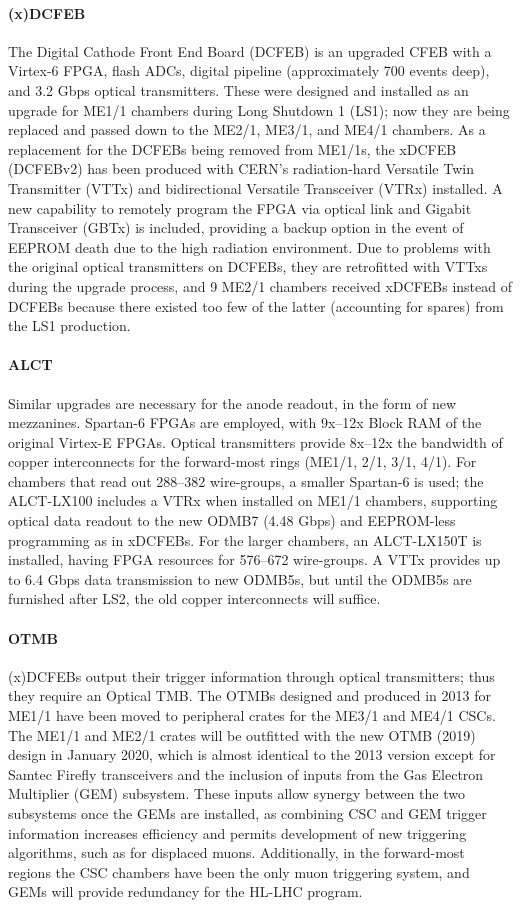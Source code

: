 \documentclass[a4paper,11pt]{article}
\begin{document}
\paragraph{(x)DCFEB}
The Digital Cathode Front End Board (DCFEB) is an upgraded CFEB with a Virtex-6 FPGA, flash ADCs, digital pipeline (approximately 700 events deep), and 3.2 Gbps optical transmitters. These were designed and installed as an upgrade for ME1/1 chambers during Long Shutdown 1 (LS1); now they are being replaced and passed down to the ME2/1, ME3/1, and ME4/1 chambers. As a replacement for the DCFEBs being removed from ME1/1s, the xDCFEB (DCFEBv2) has been produced with CERN's radiation-hard Versatile Twin Transmitter (VTTx) and bidirectional Versatile Transceiver (VTRx) installed. A new capability to remotely program the FPGA via optical link and Gigabit Transceiver (GBTx) is included, providing a backup option in the event of EEPROM death due to the high radiation environment. Due to problems with the original optical transmitters on DCFEBs, they are retrofitted with VTTxs during the upgrade process, and 9 ME2/1 chambers received xDCFEBs instead of DCFEBs because there existed too few of the latter (accounting for spares) from the LS1 production.
\paragraph{ALCT}
Similar upgrades are necessary for the anode readout, in the form of new mezzanines.  Spartan-6 FPGAs are employed, with 9x--12x Block RAM of the original Virtex-E FPGAs. Optical transmitters provide 8x--12x the bandwidth of copper interconnects for the forward-most rings (ME1/1, 2/1, 3/1, 4/1). For chambers that read out 288--382 wire-groups, a smaller Spartan-6 is used; the ALCT-LX100 includes a VTRx when installed on ME1/1 chambers, supporting optical data readout to the new ODMB7 (4.48 Gbps) and EEPROM-less programming as in xDCFEBs. For the larger chambers, an ALCT-LX150T is installed, having FPGA resources for 576--672 wire-groups. A VTTx provides up to 6.4 Gbps data transmission to new ODMB5s, but until the ODMB5s are furnished after LS2, the old copper interconnects will suffice.

\paragraph{OTMB}
(x)DCFEBs output their trigger information through optical transmitters; thus they require an Optical TMB. The OTMBs designed and produced in 2013 for ME1/1 have been moved to peripheral crates for the ME3/1 and ME4/1 CSCs. The ME1/1 and ME2/1 crates will be outfitted with the new OTMB (2019) design in January 2020, which is almost identical to the 2013 version except for Samtec Firefly transceivers and the inclusion of inputs from the Gas Electron Multiplier (GEM) subsystem. These inputs allow synergy between the two subsystems once the GEMs are installed, as 
combining CSC and GEM trigger information increases efficiency and permits development of new triggering algorithms, such as for displaced muons. Additionally, in the forward-most regions the CSC chambers have been the only muon triggering system, and GEMs will provide redundancy for the HL-LHC program.
\end{document}
